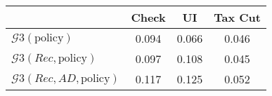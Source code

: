 \begin{tabular}{@{}lccc@{}} 
\toprule 
                          & Check      & UI    & Tax Cut    \\  \midrule 
$\mathcal{G}3(\text{policy})$ & 0.094  & 0.066  & 0.046     \\ 
$\mathcal{G}3(Rec,\text{policy})$ & 0.097  & 0.108  & 0.045     \\ 
$\mathcal{G}3(Rec, AD,\text{policy})$ & 0.117  & 0.125  & 0.052     \\ 
\end{tabular}  
